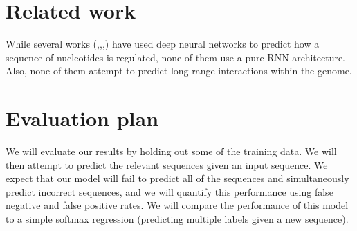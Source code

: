\documentclass[11pt,onecolumn]{article}
\begin{document}
\section{Related work}
While several works (\cite{alipanahi2015predicting},\cite{kelley2015basset},\cite{quang2015danq},\cite{zhou2015predicting}) have used deep neural networks to predict how a sequence of nucleotides is regulated, none of them use a pure RNN architecture. Also, none of them attempt to predict long-range interactions within the genome.

\section{Evaluation plan}
We will evaluate our results by holding out some of the training data. We will then attempt to predict the relevant sequences given an input sequence. We expect that our model will fail to predict all of the sequences and simultaneously predict incorrect sequences, and we will quantify this performance using false negative and false positive rates. We will compare the performance of this model to a simple softmax regression (predicting multiple labels given a new sequence). 



\end{document}

